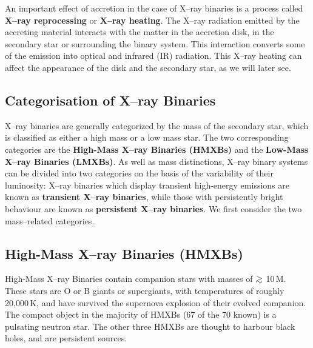 An important effect of accretion in the case of X--ray binaries is a
process called \textbf{X--ray reprocessing} or \textbf{X--ray heating}. The X--ray radiation emitted by the
accreting material interacts with the matter in the accretion disk, in
the secondary star or surrounding the binary system. This interaction
converts some of the emission into optical and infrared (IR) radiation. This
X--ray heating can affect the appearance of the disk and the secondary
star, as we will later see. %


\subsection{Categorisation of X--ray Binaries}
\label{cha:Introduction:sec:X--rayBinaries:subsec:CategorizationOfX--rayBinaries}

X--ray binaries are generally categorized by the mass of the
secondary star, which is classified as either a high mass or a low
mass star. The two corresponding categories are the \textbf{High-Mass
X--ray Binaries (HMXBs)} and the \textbf{Low-Mass X--ray Binaries (LMXBs)}. %
As well as mass distinctions, X--ray binary systems can be divided into
two categories on the basis of the variability of their luminosity: %
X--ray binaries which display transient high-energy emissions are known as
\textbf{transient X--ray binaries}, while those with persistently bright behaviour are known as
\textbf{persistent X--ray binaries}. We first consider the two mass--related categories. %


\subsection{High-Mass X--ray Binaries (HMXBs)}
\label{cha:Introduction:sec:X--rayBinaries:subsec:HMXBs}

High-Mass X--ray Binaries contain companion stars with masses of $\gsim$
10\,M\sun. These stars are O or B giants or supergiants, %
with temperatures of roughly 20,000\,K, %
and have survived the supernova explosion of their evolved
companion. %
The compact object in the majority of HMXBs (67 of the 70 known) is a pulsating neutron
star. 
The other three HMXBs are thought to harbour black holes, and are persistent sources. %

